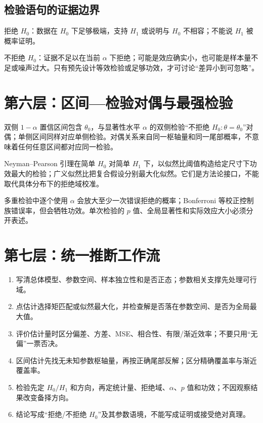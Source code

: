 \documentclass[11pt,a4paper]{ctexart}
\begin{document}
\subsection{检验语句的证据边界}

拒绝 $H_0$：数据在 $H_0$ 下足够极端，支持 $H_1$ 或说明与 $H_0$ 不相容；不能说 $H_1$ 被概率证明。

不拒绝 $H_0$：证据不足以在当前 $\alpha$ 下拒绝；可能是效应确实小，也可能是样本量不足或噪声过大。只有预先设计等效检验或足够功效，才可讨论“差异小到可忽略”。

\section{第六层：区间—检验对偶与最强检验}

双侧 $1-\alpha$ 置信区间包含 $\theta_0$，与显著性水平 $\alpha$ 的双侧检验“不拒绝 $H_0:\theta=\theta_0$”对偶；单侧区间同样对应单侧检验。对偶关系来自同一枢轴量和同一尾部概率，不意味着任何任意区间都对应同一检验。

Neyman--Pearson 引理在简单 $H_0$ 对简单 $H_1$ 下，以似然比阈值构造给定尺寸下功效最大的检验；广义似然比把复合假设分别最大化似然。它们是方法论接口，不能取代具体分布下的拒绝域校准。

多重检验中逐个使用 $\alpha$ 会放大至少一次错误拒绝的概率；Bonferroni 等校正控制族错误率，但会牺牲功效。单次检验的 $p$ 值、全局显著性和实际效应大小必须分开表述。

\section{第七层：统一推断工作流}

\begin{enumerate}
  \item 写清总体模型、参数空间、样本独立性和是否正态；参数相关支撑先处理可行域。
  \item 点估计选择矩匹配或似然最大化，并检查解是否落在参数空间、是否为全局最大值。
  \item 评价估计量时区分偏差、方差、MSE、相合性、有限/渐近效率；不要只用“无偏”一票否决。
  \item 区间估计先找无未知参数枢轴量，再按正确尾部反解；区分精确覆盖率与渐近覆盖率。
  \item 检验先定 $H_0/H_1$ 和方向，再定统计量、拒绝域、$\alpha$、$p$ 值和功效；不因观察结果改变备择方向。
  \item 结论写成“拒绝/不拒绝 $H_0$”及其参数语境，不能写成证明或接受绝对真理。
\end{enumerate}
\end{document}
